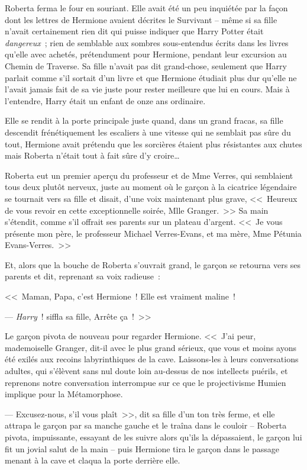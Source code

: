 Roberta ferma le four en souriant. Elle avait été un peu inquiétée par la façon dont les lettres de Hermione avaient décrites le Survivant -- même si sa fille n'avait certainement rien dit qui puisse indiquer que Harry Potter était \emph{dangereux}~; rien de semblable aux sombres sous-entendus écrits dans les livres qu'elle avec achetés, prétendument pour Hermione, pendant leur excursion au Chemin de Traverse. Sa fille n'avait pas dit grand-chose, seulement que Harry parlait comme s'il sortait d'un livre et que Hermione étudiait plus dur qu'elle ne l'avait jamais fait de sa vie juste pour rester meilleure que lui en cours. Mais à l'entendre, Harry était un enfant de onze ans ordinaire.

Elle se rendit à la porte principale juste quand, dans un grand fracas, sa fille descendit frénétiquement les escaliers à une vitesse qui ne semblait pas sûre du tout, Hermione avait prétendu que les sorcières étaient plus résistantes aux chutes mais Roberta n'était tout à fait sûre d'y croire…

Roberta eut un premier aperçu du professeur et de Mme Verres, qui semblaient tous deux plutôt nerveux, juste au moment où le garçon à la cicatrice légendaire se tournait vers sa fille et disait, d'une voix maintenant plus grave, <<~Heureux de vous revoir en cette exceptionnelle soirée, Mlle Granger.~>> Sa main s'étendit, comme s'il offrait ses parents sur un plateau d'argent. <<~Je vous présente mon père, le professeur Michael Verres-Evans, et ma mère, Mme Pétunia Evans-Verres.~>>

Et, alors que la bouche de Roberta s'ouvrait grand, le garçon se retourna vers ses parents et dit, reprenant sa voix radieuse~:

<<~Maman, Papa, c'est Hermione~! Elle est vraiment maline~!

--- \emph{Harry}~! siffla sa fille, Arrête ça~!~>>

Le garçon pivota de nouveau pour regarder Hermione. <<~J'ai peur, mademoiselle Granger, dit-il avec le plus grand sérieux, que vous et moins ayons été exilés aux recoins labyrinthiques de la cave. Laissons-les à leurs conversations adultes, qui s'élèvent sans nul doute loin au-dessus de nos intellects puérils, et reprenons notre conversation interrompue sur ce que le projectivisme Humien implique pour la Métamorphose.

--- Excusez-nous, s'il vous plaît~>>, dit sa fille d'un ton très ferme, et elle attrapa le garçon par sa manche gauche et le traîna dans le couloir -- Roberta pivota, impuissante, essayant de les suivre alors qu'ils la dépassaient, le garçon lui fit un jovial salut de la main -- puis Hermione tira le garçon dans le passage menant à la cave et claqua la porte derrière elle.

